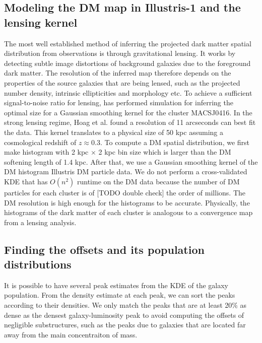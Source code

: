 \subsection{Modeling the DM map in Illustris-1 and the lensing kernel}
The most well established method of inferring the projected dark matter spatial 
distribution from observations is through gravitational lensing.
It works by detecting subtle image distortions of background galaxies due to
the foreground dark matter. The resolution of the inferred map therefore 
depends on the properties of the source galaxies that are being lensed, 
such as the projected number density, 
intrinsic ellipticities and morphology etc.
To achieve a sufficient signal-to-noise ratio for lensing, 
\citealt{Hoag2016}  has performed simulation for inferring the optimal size
for a Gaussian smoothing kernel for the cluster MACSJ0416. 
In the strong lensing regime, Hoag et al. found a resolution of 11 arcseconds
can best fit the data. This kernel translates to a physical size of 50 
kpc assuming a cosmological redshift of $z \approx 0.3$.
To compute a DM spatial distribution, we first make histogram with 2 kpc
$\times$ 2 kpc bin size which is larger than the DM softening length of 1.4 kpc. 
After that, we use a Gaussian smoothing kernel of the DM histogram Illustris DM
particle data. We do not perform a cross-validated KDE that has
$O(n^2)$ runtime on the DM data because the
number of DM particles for each cluster is of 
[TODO double check] the order of millions. The DM
resolution is high enough for the histograms to be accurate.  
Physically, the histograms of the dark matter of each cluster 
is analogous to a convergence map from a lensing analysis. 




\subsection{Finding the offsets and its population distributions} 
\label{subsec:offsets}
It is possible to have several peak estimates from the KDE of the galaxy 
population. 
From the density estimate at each peak, we can sort 
the peaks according to their densities. We only match the peaks that are at 
least 20\% as dense as the densest galaxy-luminosity peak to avoid computing 
the offsets of negligible substructures, such as the peaks due to galaxies that
are located far away from the main concentraiton of mass.

